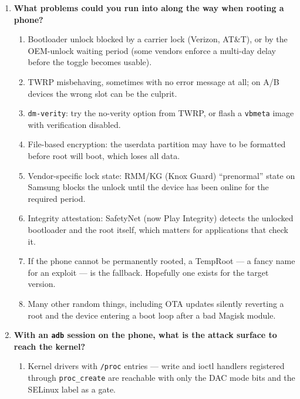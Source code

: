 \documentclass[12pt]{Training}
\begin{document}
\begin{enumerate}
\begin{enumerate}
        \item Boot into recovery mode, which brings up TWRP.
        \item Install SuperSU or Magisk. Modern systemless root (Magisk) patches the boot ramdisk rather than the system partition, which is what survives \lstinline{dm-verity} and OTA updates.
        \item Reboot and \lstinline{su}.
    \end{enumerate}
    \item \textbf{What problems could you run into along the way when rooting a phone?}
    \begin{enumerate}
        \item Bootloader unlock blocked by a carrier lock (Verizon, AT\&T), or by the OEM-unlock waiting period (some vendors enforce a multi-day delay before the toggle becomes usable).
        \item TWRP misbehaving, sometimes with no error message at all; on A/B devices the wrong slot can be the culprit.
        \item \lstinline{dm-verity}: try the no-verity option from TWRP, or flash a \lstinline{vbmeta} image with verification disabled.
        \item File-based encryption: the userdata partition may have to be formatted before root will boot, which loses all data.
        \item Vendor-specific lock state: RMM/KG (Knox Guard) ``prenormal'' state on Samsung blocks the unlock until the device has been online for the required period.
        \item Integrity attestation: SafetyNet (now Play Integrity) detects the unlocked bootloader and the root itself, which matters for applications that check it.
        \item If the phone cannot be permanently rooted, a TempRoot --- a fancy name for an exploit --- is the fallback. Hopefully one exists for the target version.
        \item Many other random things, including OTA updates silently reverting a root and the device entering a boot loop after a bad Magisk module.
    \end{enumerate}
    \item \textbf{With an \lstinline{adb} session on the phone, what is the attack surface to reach the kernel?}
    \begin{enumerate}
        \item Kernel drivers with \lstinline{/proc} entries --- write and ioctl handlers registered through \lstinline{proc_create} are reachable with only the DAC mode bits and the SELinux label as a gate.

\end{enumerate}
\end{enumerate}
\end{document}
